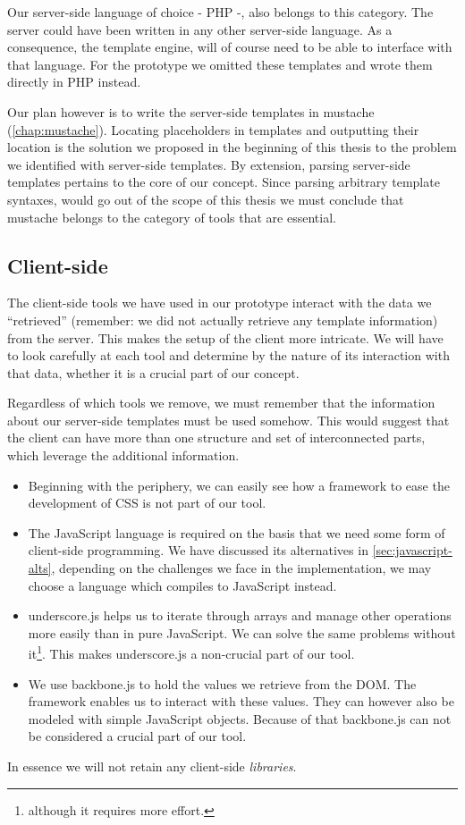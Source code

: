 \documentclass[thesis.tex]{subfiles}
\begin{document}
Our server-side language of choice - PHP -, also belongs to this category.
The server could have been written in any other server-side language.
As a consequence, the template engine, will of course need to be
able to interface with that language. For the prototype we omitted these
templates and wrote them directly in PHP instead.

Our plan however is to write the server-side templates in mustache
(\ref{chap:mustache}).
Locating placeholders in templates and outputting their location is the solution
we proposed in the beginning of this thesis to the problem we identified with
server-side templates.
By extension, parsing server-side templates pertains to the core of our concept.
Since parsing arbitrary template syntaxes, would go out of the scope of this
thesis we must conclude that mustache belongs to the category of tools that
are essential.

\subsection{Client-side}
The client-side tools we have used in our prototype interact with the data we
``retrieved'' (remember: we did not actually retrieve any template information)
from the server. This makes the setup of the client more intricate. We will have
to look carefully at each tool and determine by the nature of its interaction
with that data, whether it is a crucial part of our concept.

Regardless of which tools we remove, we must remember that the information about
our server-side templates must be used somehow. This would suggest that the
client can have more than one structure and set of interconnected parts, which
leverage the additional information.

\begin{itemize}
\item Beginning with the periphery, we can easily see how a framework to ease
the development of CSS is not part of our tool.
\item The JavaScript language is required on the basis that we need some form of
client-side programming. We have discussed its alternatives in
\ref{sec:javascript-alts}, depending on the challenges we face in the
implementation, we may choose a language which compiles to JavaScript instead.
\item underscore.js helps us to iterate through arrays and manage other
operations more easily than in pure JavaScript. We can solve the same problems
without it\footnote{
	although it requires more effort.
}. This makes underscore.js a non-crucial part of our tool.
\item We use backbone.js to hold the values we retrieve from the DOM. The
framework enables us to interact with these values. They can however also be
modeled with simple JavaScript objects. Because of that backbone.js can not be
considered a crucial part of our tool.
\end{itemize}

In essence we will not retain any client-side \emph{libraries}.
\end{document}
